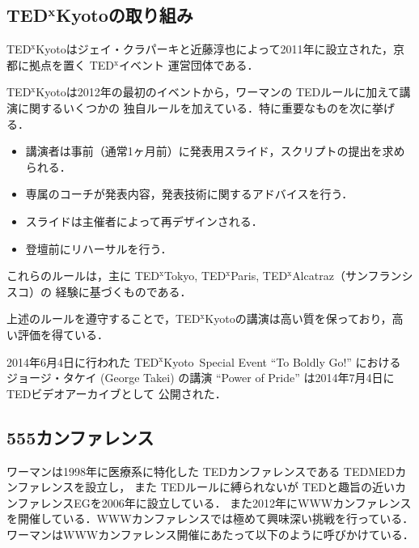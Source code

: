 \documentclass[submit,techreq,jkeyword,noauthor]{ipsj}
\newcommand{\TED}{\textrm{TED}}
\newcommand{\TEDMED}{\textrm{TEDMED}}
\newcommand{\TEDx}{\TED${}^{\textrm{x}}$}
\newcommand{\TEDxTokyo}{\TEDx\textrm{Tokyo}}
\newcommand{\TEDxKyoto}{\TEDx\textrm{Kyoto}}
\newcommand{\TEDxParis}{\TEDx\textrm{Paris}}
\newcommand{\TEDxAlcatraz}{\TEDx\textrm{Alcatraz}}
\newcommand{\TEDtitle}{\textbf{TED}}
\newcommand{\TEDxtitle}{\TEDtitle${}^{\textbf{x}}$}
\newcommand{\TEDxKyototitle}{\TEDxtitle\textbf{Kyoto}}
\begin{document}
\subsection{\TEDxKyototitle の取り組み}

\TEDxKyoto はジェイ・クラパーキと近藤淳也によって2011年に設立された，京都に拠点を置く \TEDx イベント
運営団体である．

\TEDxKyoto は2012年の最初のイベントから，ワーマンの \TED ルールに加えて講演に関するいくつかの
独自ルールを加えている．特に重要なものを次に挙げる．
\begin{itemize}
\item 講演者は事前（通常1ヶ月前）に発表用スライド，スクリプトの提出を求められる．
\item 専属のコーチが発表内容，発表技術に関するアドバイスを行う．
\item スライドは主催者によって再デザインされる．
\item 登壇前にリハーサルを行う．
\end{itemize}
これらのルールは，主に \TEDxTokyo, \TEDxParis, \TEDxAlcatraz  （サンフランシスコ）の
経験に基づくものである．

上述のルールを遵守することで，\TEDxKyoto の講演は高い質を保っており，高い評価を得ている．\cite{ml}

2014年6月4日に行われた \TEDxKyoto\ Special Event ``To Boldly Go!'' における
ジョージ・タケイ (George Takei) の講演 ``Power of Pride'' は2014年7月4日に \TED ビデオアーカイブとして
公開された．

\subsection{555カンファレンス}


ワーマンは1998年に医療系に特化した \TED カンファレンスである \TEDMED カンファレンスを設立し，
また \TED ルールに縛られないが \TED と趣旨の近いカンファレンスEGを2006年に設立している．
また2012年にWWWカンファレンスを開催している．WWWカンファレンスでは極めて興味深い挑戦を行っている．
ワーマンはWWWカンファレンス開催にあたって以下のように呼びかけている．\cite{wwwweb}
\end{document}
